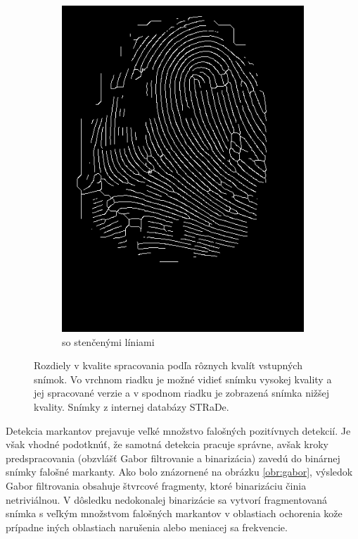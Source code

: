 \begin{figure}[h]
\begin{subfigure}[b]{0.3\linewidth}
      \includegraphics[width=\linewidth]{obrazky-figures/ecsema_thin.png}
      \caption{so stenčenými líniami}
    \end{subfigure}
    \caption{Rozdiely v kvalite spracovania podľa rôznych kvalít vstupných snímok. Vo vrchnom riadku je možné vidieť snímku vysokej kvality a jej spracované
    verzie a v spodnom riadku je zobrazená snímka nižšej kvality. Snímky z internej databázy STRaDe.}
    \label{obr:porovnanie_kvality}
  \end{figure}

  Detekcia markantov prejavuje veľké množstvo falošných pozitívnych detekcií. Je však vhodné podotknúť, že samotná detekcia pracuje správne, avšak kroky
  predspracovania (obzvlášť Gabor filtrovanie a binarizácia) zavedú do binárnej snímky falošné markanty. Ako bolo znázornené na obrázku \ref{obr:gabor},
  výsledok Gabor filtrovania obsahuje štvrcové fragmenty, ktoré binarizáciu činia netriviálnou. V dôsledku nedokonalej binarizácie sa vytvorí fragmentovaná
  snímka s veľkým množstvom falošných markantov v oblastiach ochorenia kože prípadne iných oblastiach narušenia alebo meniacej sa frekvencie.

